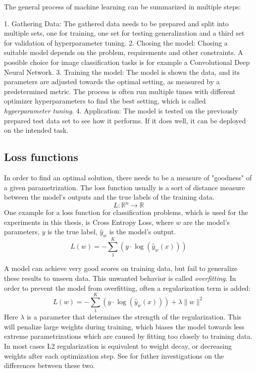 \documentclass[twoside,12pt,a4paper]{report}
\begin{document}
The general process of machine learning can be summarized in multiple steps:
\\

\begin{markdown}
1. Gathering Data: The gathered data needs to be prepared and split into multiple sets, one for training, one set for testing generalization and a third set for validation of hyperparameter tuning.
2. Chosing the model: Chosing a suitable model depends on the problem, requirements and other constraints. A possible choice for image classification tasks is for example a Convolutional Deep Neural Network.
3. Training the model: The model is shown the data, and its parameters are adjusted towards the optimal setting, as measured by a predetermined metric. The process is often run multiple times with different optimizer hyperparameters to find the best setting, which is called \textit{hyperparameter tuning}.
4. Application: The model is tested on the previously prepared test data set to see how it performs. If it does well, it can be deployed on the intended task.
\end{markdown}

\subsection{Loss functions}
In order to find an optimal solution, there needs to be a measure of "goodness" of a given parametrization.
The loss function usually is a sort of distance measure between the model's outputs and the true labels of the training data.
$$L: \mathbb{R}^n \rightarrow \mathbb{R}$$
One example for a loss function for classification problems, which is used for the experiments in this thesis, is Cross Entropy Loss, where $w$ are the model's parameters, $y$ is the true label, $\hat{y}_w$ is the model's output.
$$L(w) = - \sum_{1}^{K}(y \cdot \log(\hat{y}_w(x)))$$

A model can achieve very good scores on training data, but fail to generalize these results to unseen data. This unwanted behavior is called \textit{overfitting}.
In order to prevent the model from overfitting, often a regularization term is added:
$$L(w) = - \sum_{1}^{K}(y \cdot \log(\hat{y}_w(x) )) + \lambda \| w\|^2 $$
Here $\lambda$ is a parameter that determines the strength of the regularization. This will penalize large weights during training, which biases the model towards less extreme parametrizations which are caused by fitting too closely to training data. In most cases L2 regularization is equivalent to weight decay, or decreasing weights after each optimization step. See \cite{Chaudhari2017entropy} for futher investigations on the differences between these two.
\end{document}
